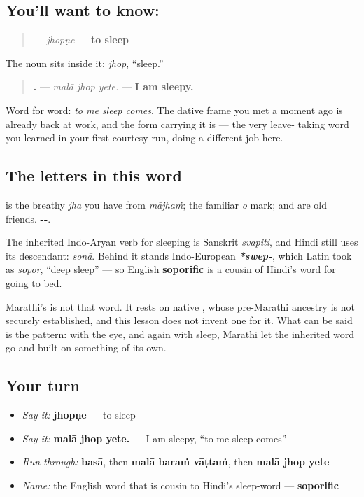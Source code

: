 \subsection*{You'll want to know: }
\begin{quote}
\textbf{} — \emph{jhopṇe} — \textbf{to sleep}
\end{quote}

The noun sits inside it: \textbf{} \emph{jhop}, \textquotedblleft{}sleep.\textquotedblright{}

\begin{quote}
\textbf{  .} — \emph{malā jhop yete.} — \textbf{I am sleepy.}
\end{quote}

Word for word: \emph{to me sleep comes}. The dative frame you met a moment ago is already back at work, and the form carrying it is \textbf{} — the very leave- taking word you learned in your first courtesy run, doing a different job here.

\subsection*{The letters in this word}
\textbf{} is the breathy \emph{jha} you have from \emph{mājhaṁ}; \textbf{} the familiar \emph{o} mark; \textbf{} and \textbf{} are old friends. \textbf{--}.

\begin{cousinweb}
The inherited Indo-Aryan verb for sleeping is Sanskrit \textbf{} \emph{svapiti}, and Hindi still uses its descendant: \textbf{} \emph{sonā}. Behind it stands Indo-European \emph{\textbf{*swep-}}, which Latin took as \emph{sopor}, \textquotedblleft{}deep sleep\textquotedblright{} — so English \textbf{soporific} is a cousin of Hindi's word for going to bed.

Marathi's \textbf{} is not that word. It rests on native \textbf{}, whose pre-Marathi ancestry is not securely established, and this lesson does not invent one for it. What can be said is the pattern: with the eye, and again with sleep, Marathi let the inherited word go and built on something of its own.
\end{cousinweb}

\subsection*{Your turn}
\begin{itemize}
\raggedright
  \item \emph{Say it:} \textbf{jhopṇe} — to sleep
  \item \emph{Say it:} \textbf{malā jhop yete.} — I am sleepy, \textquotedblleft{}to me sleep comes\textquotedblright{}
  \item \emph{Run through:} \textbf{basā}, then \textbf{malā baraṁ vāṭtaṁ}, then \textbf{malā jhop yete}
  \item \emph{Name:} the English word that is cousin to Hindi's sleep-word — \textbf{soporific}
\end{itemize}

